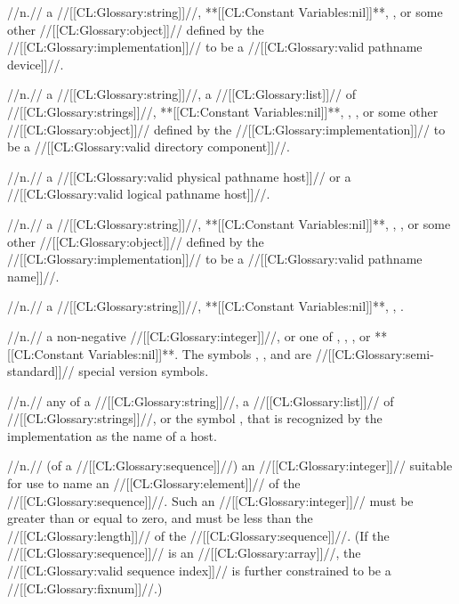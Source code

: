 //n.// a //[[CL:Glossary:string]]//, **[[CL:Constant Variables:nil]]**, , or some other //[[CL:Glossary:object]]// defined by the //[[CL:Glossary:implementation]]// to be a //[[CL:Glossary:valid pathname device]]//.

 //n.// a //[[CL:Glossary:string]]//, a //[[CL:Glossary:list]]// of //[[CL:Glossary:strings]]//, **[[CL:Constant Variables:nil]]**,
 , , or some other //[[CL:Glossary:object]]// defined by the //[[CL:Glossary:implementation]]// to be a //[[CL:Glossary:valid directory component]]//.

 //n.// a //[[CL:Glossary:valid physical pathname host]]// or a //[[CL:Glossary:valid logical pathname host]]//.

 //n.// a //[[CL:Glossary:string]]//, **[[CL:Constant Variables:nil]]**, , , or some other //[[CL:Glossary:object]]// defined by the //[[CL:Glossary:implementation]]// to be a //[[CL:Glossary:valid pathname name]]//.

 //n.// a //[[CL:Glossary:string]]//, **[[CL:Constant Variables:nil]]**, , .

 //n.// a non-negative //[[CL:Glossary:integer]]//, or one of , , , or **[[CL:Constant Variables:nil]]**.
 The symbols , , and  are
 //[[CL:Glossary:semi-standard]]// special version symbols.

 //n.// any of a //[[CL:Glossary:string]]//, a //[[CL:Glossary:list]]// of //[[CL:Glossary:strings]]//, or the symbol , that is recognized by the implementation as the name of a host.


 //n.// (of a //[[CL:Glossary:sequence]]//) an //[[CL:Glossary:integer]]// suitable for use to name an //[[CL:Glossary:element]]// of the //[[CL:Glossary:sequence]]//. Such an //[[CL:Glossary:integer]]// must be greater than or equal to zero, and must be less than the //[[CL:Glossary:length]]// of the //[[CL:Glossary:sequence]]//.
 (If the //[[CL:Glossary:sequence]]// is an //[[CL:Glossary:array]]//, the //[[CL:Glossary:valid sequence index]]// is further constrained to be a //[[CL:Glossary:fixnum]]//.)


